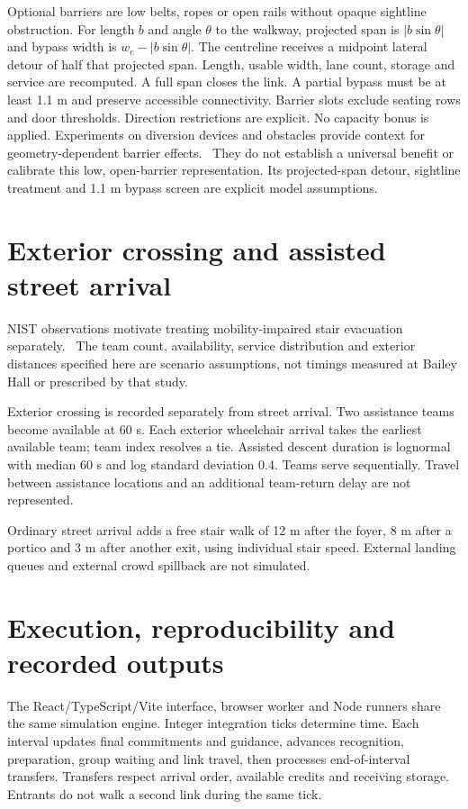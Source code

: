 \documentclass[11pt,a4paper]{article}
\begin{document}
Optional barriers are low belts, ropes or open rails without opaque sightline obstruction. For length $b$ and angle $\theta$ to the walkway, projected span is $|b\sin\theta|$ and bypass width is $w_e-|b\sin\theta|$. The centreline receives a midpoint lateral detour of half that projected span. Length, usable width, lane count, storage and service are recomputed. A full span closes the link. A partial bypass must be at least 1.1 m and preserve accessible connectivity. Barrier slots exclude seating rows and door thresholds. Direction restrictions are explicit. No capacity bonus is applied. Experiments on diversion devices and obstacles provide context for geometry-dependent barrier effects.~\cite{wang,feliciani} They do not establish a universal benefit or calibrate this low, open-barrier representation. Its projected-span detour, sightline treatment and 1.1 m bypass screen are explicit model assumptions.~\cite{model,implementation}

\section{Exterior crossing and assisted street arrival}
NIST observations motivate treating mobility-impaired stair evacuation separately.~\cite{mobility} The team count, availability, service distribution and exterior distances specified here are scenario assumptions, not timings measured at Bailey Hall or prescribed by that study.~\cite{model,implementation}

Exterior crossing is recorded separately from street arrival. Two assistance teams become available at 60 s. Each exterior wheelchair arrival takes the earliest available team; team index resolves a tie. Assisted descent duration is lognormal with median 60 s and log standard deviation 0.4. Teams serve sequentially. Travel between assistance locations and an additional team-return delay are not represented.

Ordinary street arrival adds a free stair walk of 12 m after the foyer, 8 m after a portico and 3 m after another exit, using individual stair speed. External landing queues and external crowd spillback are not simulated.

\section{Execution, reproducibility and recorded outputs}
The React/TypeScript/Vite interface, browser worker and Node runners share the same simulation engine. Integer integration ticks determine time. Each interval updates final commitments and guidance, advances recognition, preparation, group waiting and link travel, then processes end-of-interval transfers. Transfers respect arrival order, available credits and receiving storage. Entrants do not walk a second link during the same tick.
\end{document}
